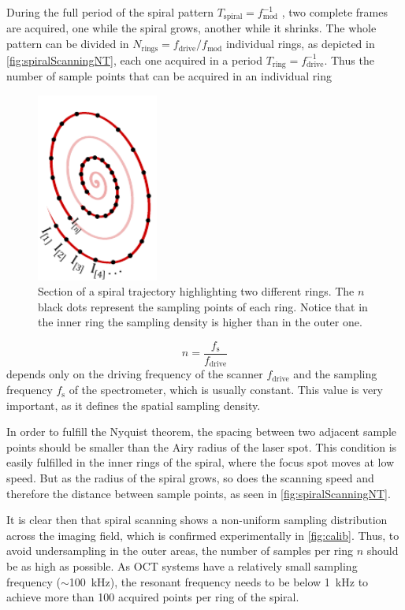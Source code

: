 During the full period of the spiral pattern $T_\mathrm{spiral}=f_\mathrm{mod}^{-1}$ , two complete frames are acquired, one while the spiral grows, another while it shrinks. The whole pattern can be divided in $N_\mathrm{rings} = f_\mathrm{drive}/f_\mathrm{mod}$ individual rings, as depicted in \autoref{fig:spiralScanningNT}, each one acquired in a period $T_\mathrm{ring}=f_\mathrm{drive}^{-1}$. Thus the number of sample points that can be acquired in an individual ring
\begin{figure}[h!]\centering
      \includegraphics[width=4cm]{figures/30_DesignSimulation/spiralScanning/spiralScanningNT.pdf}
      \caption{Section of a spiral trajectory highlighting two different rings. The $n$ black dots represent the sampling points of each ring. Notice that in the inner ring the sampling density is higher than in the outer one.}
      \label{fig:spiralScanningNT}
\end{figure}
\begin{equation}
n = \frac{f_\mathrm{s}}{f_\mathrm{drive}}
\label{eq:nT}
\end{equation}
depends only on the driving frequency of the scanner $f_\mathrm{drive}$ and the sampling frequency $f_\mathrm{s}$ of the spectrometer, which is usually constant. This value is very important, as it defines the spatial sampling density. 

In order to fulfill the Nyquist theorem, the spacing between two adjacent sample points should be smaller than the Airy radius of the laser spot. This condition is easily fulfilled in the inner rings of the spiral, where the focus spot moves at low speed. But as the radius of the spiral grows, so does the scanning speed and therefore the distance between sample points, as seen in \autoref{fig:spiralScanningNT}.

It is clear then that spiral scanning shows a non-uniform sampling distribution across the imaging field, which is confirmed experimentally in \autoref{fig:calib}. Thus, to avoid undersampling in the outer areas, the number of samples per ring $n$ should be as high as possible. As OCT systems have a relatively small sampling frequency ($\sim$\SI{100}{\kilo\hertz}), the resonant frequency needs to be below \SI{1}{kHz} to achieve more than 100 acquired points per ring of the spiral.


